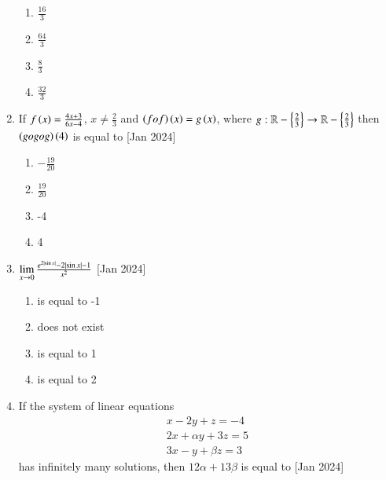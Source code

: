 \documentclass[journal]{IEEEtran}
\begin{document}
\begin{enumerate}
\begin{multicols}{4}
\begin{enumerate}
        \item $\frac{16}{3}$
        \item $\frac{64}{3}$
        \item $\frac{8}{3}$
        \item $\frac{32}{3}$
    \end{enumerate}
\end{multicols}

    \item If $f\left(x\right) = \frac{4x+3}{6x-4}$, $x \ne \frac{2}{3}$ and
    $\left(fof\right)\left(x\right) = g\left(x\right)$, where $g:\mathbb{R} - \left\{\frac{2}{3}\right\} \to
    \mathbb{R} - \left\{\frac{2}{3}\right\}$ then $\left(gogog\right)\left(4\right)$ is equal to
    \hfill{[Jan 2024]}
    
    \begin{multicols}{4}
\begin{enumerate}

        \item $-\frac{19}{20}$
        \item $\frac{19}{20}$
        \item -4
        \item 4
    \end{enumerate}
\end{multicols}

    \item $\lim\limits_{x \to 0} \frac{e^{2\left\vert\sin x\right\vert} - 2\left\vert\sin x\right\vert - 1}{x^2}$
    \hfill{[Jan 2024]}
    
    \begin{multicols}{4}
\begin{enumerate}

        \item is equal to -1 
        \item does not exist
        \item is equal to 1 
        \item is equal to 2 
    \end{enumerate}
\end{multicols}

    \item If the system of linear equations
    \begin{align*}
        x - 2y + z = -4 \\
        2x + \alpha y + 3z = 5 \\
        3x - y + \beta z = 3
    \end{align*}
    has infinitely many solutions, then $12\alpha + 13\beta$ is equal to
    \hfill{[Jan 2024]}


\end{enumerate}
\end{document}
